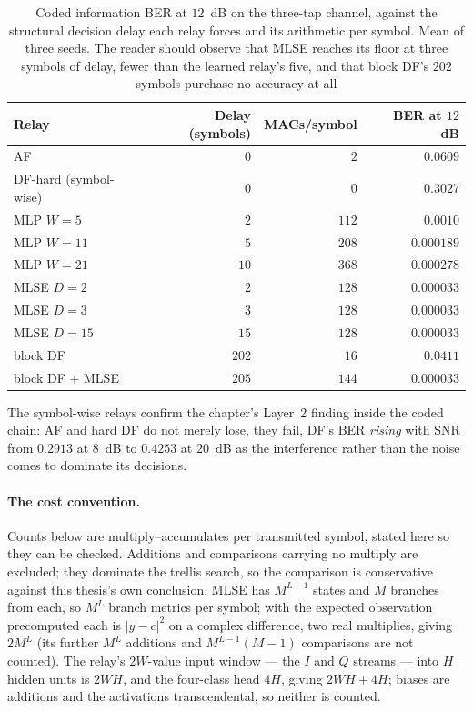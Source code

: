 \begin{table}[htbp]
\centering
\caption[Relay cost and accuracy under a latency constraint]{Coded information BER at $12$~dB on the three-tap channel, against the structural decision delay each relay forces and its arithmetic per symbol. Mean of three seeds. The reader should observe that MLSE reaches its floor at three symbols of delay, fewer than the learned relay's five, and that block DF's $202$ symbols purchase no accuracy at all}\label{tbl:joint-latency}
\begin{tabular}{lrrr}
\toprule
Relay & Delay (symbols) & MACs/symbol & BER at $12$~dB \\
\midrule
AF                    & $0$   & $2$   & $0.0609$ \\
DF-hard (symbol-wise) & $0$   & $0$   & $0.3027$ \\
MLP $W=5$             & $2$   & $112$ & $0.0010$ \\
MLP $W=11$            & $5$   & $208$ & $0.000189$ \\
MLP $W=21$            & $10$  & $368$ & $0.000278$ \\
MLSE $D=2$            & $2$   & $128$ & $\mathbf{0.000033}$ \\
MLSE $D=3$            & $3$   & $128$ & $\mathbf{0.000033}$ \\
MLSE $D=15$           & $15$  & $128$ & $\mathbf{0.000033}$ \\
block DF              & $202$ & $16$  & $0.0411$ \\
block DF $+$ MLSE     & $205$ & $144$ & $0.000033$ \\
\bottomrule
\end{tabular}
\end{table}

The symbol-wise relays confirm the chapter's Layer~2 finding inside the coded chain: AF and hard DF do not merely lose, they fail, DF's BER \emph{rising} with SNR from $0.2913$ at $8$~dB to $0.4253$ at $20$~dB as the interference rather than the noise comes to dominate its decisions.

\paragraph{The cost convention.} Counts below are multiply--accumulates per transmitted symbol, stated here so they can be checked. Additions and comparisons carrying no multiply are excluded; they dominate the trellis search, so the comparison is conservative against this thesis's own conclusion. MLSE has $M^{L-1}$ states and $M$ branches from each, so $M^{L}$ branch metrics per symbol; with the expected observation precomputed each is $|y-c|^{2}$ on a complex difference, two real multiplies, giving $2M^{L}$ (its further $M^{L}$ additions and $M^{L-1}(M-1)$ comparisons are not counted). The relay's $2W$-value input window --- the $I$ and $Q$ streams --- into $H$ hidden units is $2WH$, and the four-class head $4H$, giving $2WH+4H$; biases are additions and the activations transcendental, so neither is counted.

